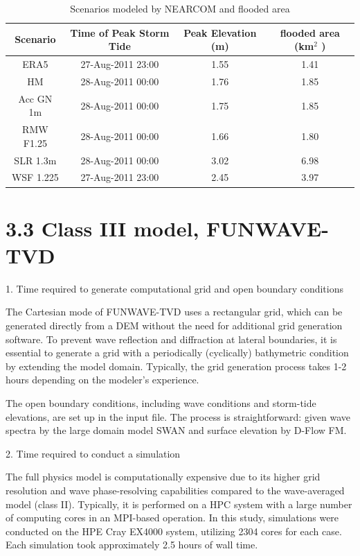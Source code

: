 \documentclass[11pt]{article}
\begin{document}
 \begin{table}[h!]
 \caption{Scenarios modeled by NEARCOM and flooded area}
 \centering
 \begin{tabular}[t]{c c c  c} \hline
  Scenario & Time of Peak Storm Tide  &  Peak Elevation (m)  &  flooded area (km$^2$ )    \\ \hline
  ERA5      & 27-Aug-2011 23:00  & 1.55   & 1.41  \\
  HM      & 28-Aug-2011 00:00  & 1.76   & 1.85 \\
  Acc GN 1m      & 28-Aug-2011 00:00  & 1.75   & 1.85  \\
  RMW F1.25      & 28-Aug-2011 00:00  & 1.66   & 1.80  \\
   SLR 1.3m      & 28-Aug-2011 00:00  & 3.02   & 6.98  \\
    WSF 1.225     & 27-Aug-2011 23:00  & 2.45   & 3.97  \\
     \hline
 \end{tabular}
\end{table}
 


\section*{3.3 Class III model, FUNWAVE-TVD}

1. Time required to generate computational grid and open boundary conditions

The Cartesian mode of FUNWAVE-TVD uses a rectangular grid, which can be generated directly from a DEM without the need for additional grid generation software. To prevent wave reflection and diffraction at lateral boundaries, it is essential to generate a grid with a periodically (cyclically) bathymetric condition by extending the model domain. Typically, the grid generation process takes 1-2 hours depending on the modeler's experience. 

The open boundary conditions, including wave conditions and storm-tide elevations, are set up in the input file. The process is straightforward:  given wave spectra by the large domain model SWAN and surface elevation by D-Flow FM. 


2. Time required to conduct a simulation 

 The full physics model is computationally expensive due to its higher grid resolution and wave phase-resolving capabilities compared to the wave-averaged model (class II). Typically, it is performed on a HPC system with a large number of computing cores in an MPI-based operation. In this study, simulations were conducted on the HPE Cray EX4000 system, utilizing 2304 cores for each case. Each simulation took approximately 2.5 hours of wall time. 
\end{document}
